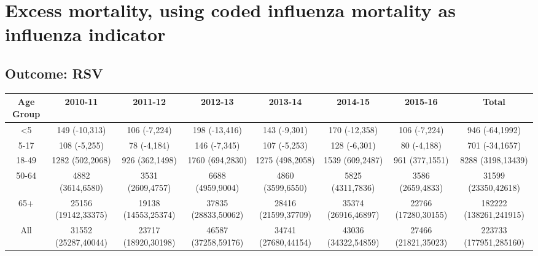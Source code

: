 \documentclass[landscape]{article}\usepackage[]{graphicx}\usepackage[]{color}
\begin{document}
\section{Excess mortality, using coded influenza mortality as influenza indicator}


\subsection{Outcome: RSV}
\begin{table}[ht]
\begin{tabular}{cccccccc}
Age Group & 2010-11 & 2011-12 & 2012-13 & 2013-14 & 2014-15 & 2015-16 & Total\\
\hline
<5 & 149 (-10,313) & 106 (-7,224) & 198 (-13,416) & 143 (-9,301) & 170 (-12,358) & 106 (-7,224) & 946 (-64,1992) \\
5-17 & 108 (-5,255) & 78 (-4,184) & 146 (-7,345) & 107 (-5,253) & 128 (-6,301) & 80 (-4,188) & 701 (-34,1657) \\
18-49 & 1282 (502,2068) & 926 (362,1498) & 1760 (694,2830) & 1275 (498,2058) & 1539 (609,2487) & 961 (377,1551) & 8288 (3198,13439) \\
50-64 & 4882 (3614,6580) & 3531 (2609,4757) & 6688 (4959,9004) & 4860 (3599,6550) & 5825 (4311,7836) & 3586 (2659,4833) & 31599 (23350,42618) \\
65+ & 25156 (19142,33375) & 19138 (14553,25374) & 37835 (28833,50062) & 28416 (21599,37709) & 35374 (26916,46897) & 22766 (17280,30155) & 182222 (138261,241915) \\
All & 31552 (25287,40044) & 23717 (18920,30198) & 46587 (37258,59176) & 34741 (27680,44154) & 43036 (34322,54859) & 27466 (21821,35023) & 223733 (177951,285160) \\

\hline
\end{tabular}
\end{table}
\end{document}
